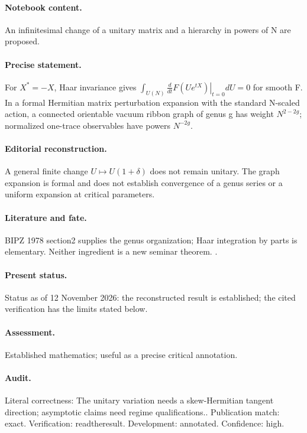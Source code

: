 \paragraph{Notebook content.} An infinitesimal change of a unitary matrix and a hierarchy in powers of N are proposed.

\paragraph{Precise statement.} For $X^*=-X$, Haar invariance gives $\int_{U(N)}\left.\frac{d}{dt}F(Ue^{tX})\right|_{t=0}dU=0$ for smooth F. In a formal Hermitian matrix perturbation expansion with the standard N-scaled action, a connected orientable vacuum ribbon graph of genus g has weight $N^{2-2g}$; normalized one-trace observables have powers $N^{-2g}$.

\paragraph{Editorial reconstruction.} A general finite change $U\mapsto U(1+\delta)$ does not remain unitary. The graph expansion is formal and does not establish convergence of a genus series or a uniform expansion at critical parameters.

\paragraph{Literature and fate.} BIPZ 1978 section2 supplies the genus organization; Haar integration by parts is elementary. Neither ingredient is a new seminar theorem. \citep{brezinitzyksonparisizuber1978planar}.

\paragraph{Present status.} Status as of 12 November 2026: the reconstructed result is established; the cited verification has the limits stated below.

\paragraph{Assessment.} Established mathematics; useful as a precise critical annotation.

\paragraph{Audit.} Literal correctness: The unitary variation needs a skew-Hermitian tangent direction; asymptotic claims need regime qualifications.. Publication match: exact. Verification: readtheresult. Development: annotated. Confidence: high.

